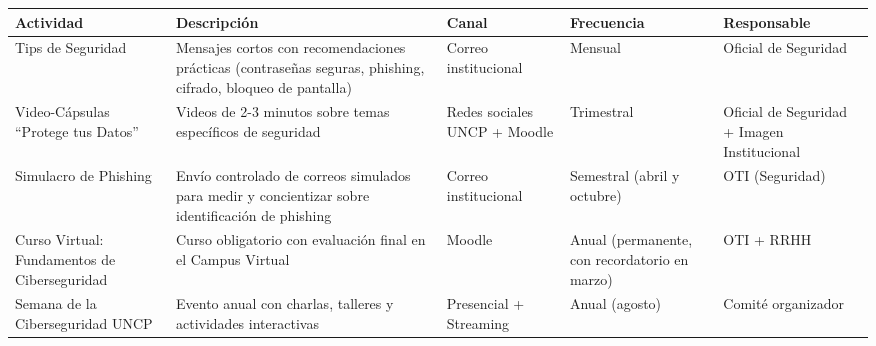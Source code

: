 \documentclass[10pt,letterpaper]{article}
\begin{document}
{\setlength{\RaggedRightRightskip}{0pt plus 5em}\small\sloppy \begin{longtable}[]{@{}
  >{\hspace{0pt}\RaggedRight\arraybackslash}p{}
  >{\hspace{0pt}\RaggedRight\arraybackslash}p{}
  >{\hspace{0pt}\RaggedRight\arraybackslash}p{}
  >{\hspace{0pt}\RaggedRight\arraybackslash}p{}
  >{\hspace{0pt}\RaggedRight\arraybackslash}p{}@{}}
\toprule\noalign{}
\begin{minipage}[b]{\linewidth}\raggedright
Actividad
\end{minipage} & \begin{minipage}[b]{\linewidth}\raggedright
Descripción
\end{minipage} & \begin{minipage}[b]{\linewidth}\raggedright
Canal
\end{minipage} & \begin{minipage}[b]{\linewidth}\raggedright
Frecuencia
\end{minipage} & \begin{minipage}[b]{\linewidth}\raggedright
Responsable
\end{minipage} \\
\midrule\noalign{}
\endhead
\bottomrule\noalign{}
\endlastfoot
Tips de Seguridad & Mensajes cortos con recomendaciones prácticas
(contraseñas seguras, phishing, cifrado, bloqueo de pantalla) & Correo
institucional & Mensual & Oficial de Seguridad \\
Video-Cápsulas ``Protege tus Datos'' & Videos de 2-3 minutos sobre temas
específicos de seguridad & Redes sociales UNCP + Moodle & Trimestral &
Oficial de Seguridad + Imagen Institucional \\
Simulacro de Phishing & Envío controlado de correos simulados para medir
y concientizar sobre identificación de phishing & Correo institucional &
Semestral (abril y octubre) & OTI (Seguridad) \\
Curso Virtual: Fundamentos de Ciberseguridad & Curso obligatorio con
evaluación final en el Campus Virtual & Moodle & Anual (permanente, con
recordatorio en marzo) & OTI + RRHH \\
Semana de la Ciberseguridad UNCP & Evento anual con charlas, talleres y
actividades interactivas & Presencial + Streaming & Anual (agosto) &
Comité organizador \\
\end{longtable}\normalsize}
\end{document}
